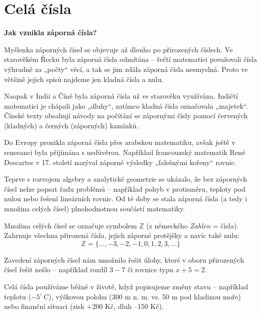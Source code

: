 \documentclass[12pt,a4paper]{article}
\begin{document}
\newpage

\section{Celá čísla}

\begin{historicalbox}
\textbf{Jak vznikla záporná čísla?}  

Myšlenka záporných čísel se objevuje až dlouho po přirozených číslech.  
Ve starověkém Řecku byla záporná čísla odmítána – řečtí matematici považovali čísla výhradně za „počty“ věcí, 
a tak se jim zdála záporná čísla nesmyslná. Proto ve většině jejich spisů najdeme jen kladná čísla a nulu.  

Naopak v Indii a Číně byla záporná čísla už ve starověku využívána. Indičtí matematici je chápali jako „dluhy“, 
zatímco kladná čísla označovala „majetek“. Čínské texty obsahují návody na počítání se zápornými čísly pomocí 
červených (kladných) a černých (záporných) kamínků.

\smallskip
Do Evropy pronikla záporná čísla přes arabskou matematiku, avšak ještě v renesanci byla přijímána s nedůvěrou.  
Například francouzský matematik René Descartes v 17. století nazýval záporné výsledky „falešnými kořeny“ rovnic.  

Teprve s rozvojem algebry a analytické geometrie se ukázalo, že bez záporných čísel nelze popsat řadu problémů – 
například pohyb v protisměru, teploty pod nulou nebo řešení lineárních rovnic.  
Od té doby se stala záporná čísla (a tedy i množina celých čísel) plnohodnotnou součástí matematiky.  

\end{historicalbox}


Množina celých čísel se označuje symbolem $\mathbb{Z}$ (z německého \textit{Zahlen} = čísla).  
Zahrnuje všechna přirozená čísla, jejich záporné protějšky a navíc také nulu:
\[
\mathbb{Z} = \{ \dots, -3, -2, -1, 0, 1, 2, 3, \dots \}
\]

Zavedení záporných čísel nám umožnilo řešit úlohy, které v oboru přirozených čísel řešit nešlo – 
například rozdíl $3-7$ či rovnice typu $x+5=2$.

\begin{notebox}
Celá čísla používáme běžně v životě, když popisujeme změny stavu – například teplotu ($-5^\circ$\,C), 
výškovou polohu (300 m n. m. vs. 50 m pod hladinou moře) nebo finanční situaci (zisk +200 Kč, dluh –150 Kč).
\end{notebox}
\end{document}
